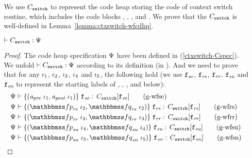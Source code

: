 We use $C_{\texttt{switch}}$ to represent the
code heap storing the code of context switch routine,
which includes the code blocks \SwitchEntry{},
\regsave{}, \regrestore{},
\SaveUsedWin{} and \SwitchNewTask{}. We prove that
the $C_{\texttt{switch}}$ is well-defined in
Lemma~\ref{lemma:ctxswitch-wfcdhp}.

\begin{lemma}
    \em
    \label{lemma:ctxswitch-wfcdhp}
    $\vdash {C_{\texttt{switch}}} : {\Psi{}}$
\end{lemma}
\begin{proof}
    The code heap specification $\Psi{}$ have been
    defined in (\ref{ctxswitch-Cspec}). We unfold
    $\vdash {C_{\texttt{switch}}} : {\Psi{}}$
    according to its definition
    (in \Fig{\ref{fig:Selected Inference Rules for Refinement Verification}}).
    And we need to prove that for any $\iota_1$,
    $\iota_2$, $\iota_3$,
    $\iota_4$ and $\iota_5$, the following hold
    (we use $\texttt{f}_{\textit{se}}$, $\texttt{f}_{\textit{rs}}$,
    $\texttt{f}_{\textit{rr}}$, $\texttt{f}_{\textit{su}}$ and
    $\texttt{f}_{\textit{sn}}$ to represent the starting labels of
    \SwitchEntry{}, \regsave{}, \regrestore{},
    \SaveUsedWin{} and \SwitchNewTask{} below):
    \begin{align}
        & \wfcblk{\Apre \ \lgvl_1}{\Apost \ \lgvl_1}
            {\lab{\textit{se}}}
            {\code_{\texttt{switch}}
            [\lab{\textit{se}}]}
            \tag{g-wfse}
            \label{ctxswitch-wfse} \\
        & \wfcblk{\relspecpre_{\textit{rs}} \ \lgvl_2}
            {\relspecpost_{\textit{rs}} \ \lgvl_2}
            {\lab{\textit{rs}}}
            {\code_{\texttt{switch}}
            [\lab{\textit{rs}}]}
            \tag{g-wfrs}
            \label{ctxswitch-wfrs} \\
        & \wfcblk{\relspecpre_{\textit{rr}} \ \lgvl_3}
            {\relspecpost_{\textit{rr}}\ \lgvl_3}
            {\lab{\textit{rr}}}
            {\code_{\texttt{switch}}
            [\lab{\textit{rr}}]}
            \tag{g-wfrr}
            \label{ctxswitch-wfrr} \\
        & \wfcblk{\relspecpre_{\textit{su}} \ \lgvl_4}
            {\relspecpost_{\textit{su}} \ \lgvl_4}
            {\lab{\textit{su}}}
            {\code_{\texttt{switch}}[\lab{\textit{su}}]}
            \tag{g-wfsu}
            \label{ctxswitch-wfsu} \\
        & \wfcblk{\relspecpre_{\textit{sn}} \ \lgvl_5}
            {\relspecpost_{\textit{sn}} \ \lgvl_5}
            {\lab{\textit{sn}}}
            {\code_{\texttt{switch}}[\lab{\textit{sn}}]}
            \tag{g-wfsn}
            \label{ctxswitch-wfsn}
    \end{align}


\end{proof}
